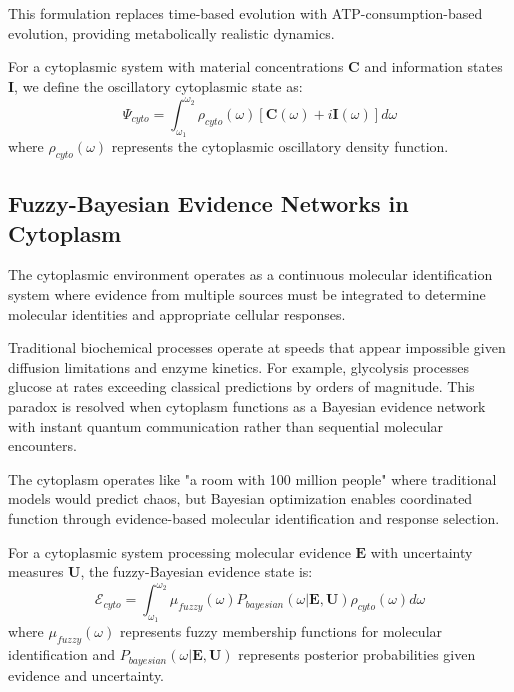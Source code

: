 ﻿\documentclass[11pt,a4paper]{article}
\begin{document}
This formulation replaces time-based evolution with ATP-consumption-based evolution, providing metabolically realistic dynamics.

\begin{definition}
For a cytoplasmic system with material concentrations $\mathbf{C}$ and information states $\mathbf{I}$, we define the oscillatory cytoplasmic state as:
\begin{equation}
\Psi_{cyto} = \int_{\omega_1}^{\omega_2} \rho_{cyto}(\omega) [\mathbf{C}(\omega) + i\mathbf{I}(\omega)] d\omega
\end{equation}
where $\rho_{cyto}(\omega)$ represents the cytoplasmic oscillatory density function.
\end{definition}

\subsection{Fuzzy-Bayesian Evidence Networks in Cytoplasm}

The cytoplasmic environment operates as a continuous molecular identification system where evidence from multiple sources must be integrated to determine molecular identities and appropriate cellular responses.

\begin{theorem}
Traditional biochemical processes operate at speeds that appear impossible given diffusion limitations and enzyme kinetics. For example, glycolysis processes glucose at rates exceeding classical predictions by orders of magnitude. This paradox is resolved when cytoplasm functions as a Bayesian evidence network with instant quantum communication rather than sequential molecular encounters.
\end{theorem}

The cytoplasm operates like "a room with 100 million people" where traditional models would predict chaos, but Bayesian optimization enables coordinated function through evidence-based molecular identification and response selection.

\begin{definition}
For a cytoplasmic system processing molecular evidence $\mathbf{E}$ with uncertainty measures $\mathbf{U}$, the fuzzy-Bayesian evidence state is:
\begin{equation}
\mathcal{E}_{cyto} = \int_{\omega_1}^{\omega_2} \mu_{fuzzy}(\omega) P_{bayesian}(\omega | \mathbf{E}, \mathbf{U}) \rho_{cyto}(\omega) d\omega
\end{equation}
where $\mu_{fuzzy}(\omega)$ represents fuzzy membership functions for molecular identification and $P_{bayesian}(\omega | \mathbf{E}, \mathbf{U})$ represents posterior probabilities given evidence and uncertainty.
\end{definition}
\end{document}
